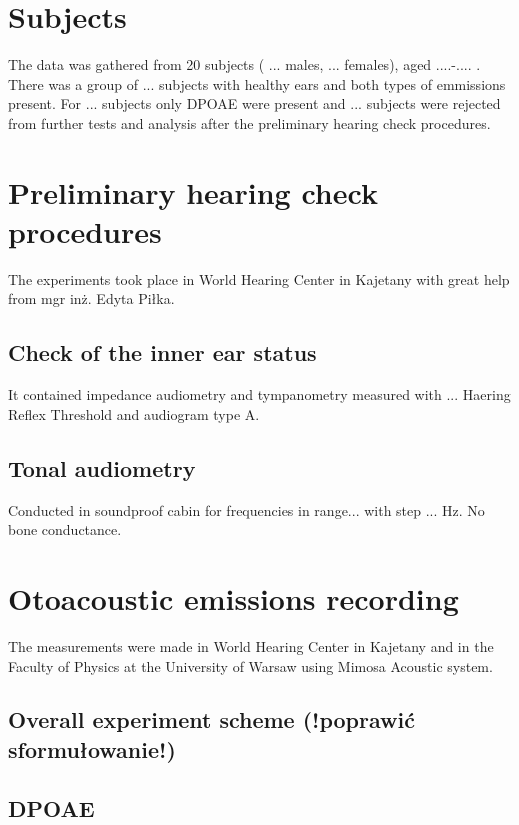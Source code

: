 \documentclass{pracalicmgr}
\begin{document}
 	\section{Subjects}
 	 The data was gathered from 20 subjects ( ... males, ... females), aged ....-.... . There was a group of ... subjects with healthy ears and both types of emmissions present. For ... subjects only DPOAE were present and ... subjects were rejected from further tests and analysis after the preliminary hearing check procedures.
 	
 	
 	\section{Preliminary hearing check procedures}
The experiments took place in World Hearing Center in Kajetany with great help from mgr inż. Edyta Piłka.
		\subsection{Check of the inner ear status}
		It contained impedance audiometry and tympanometry measured with ... Haering Reflex Threshold and audiogram type A.
		\subsection{Tonal audiometry}
		Conducted in soundproof cabin for frequencies in range... with step ... Hz. No bone conductance.
 	
 	\section{Otoacoustic emissions recording}
 	The measurements were made in World Hearing Center in Kajetany and in the Faculty of Physics at the University of Warsaw using Mimosa Acoustic system. 
 	\subsection{Overall experiment scheme (!poprawić sformułowanie!)}
	\subsection{DPOAE}
\end{document}
